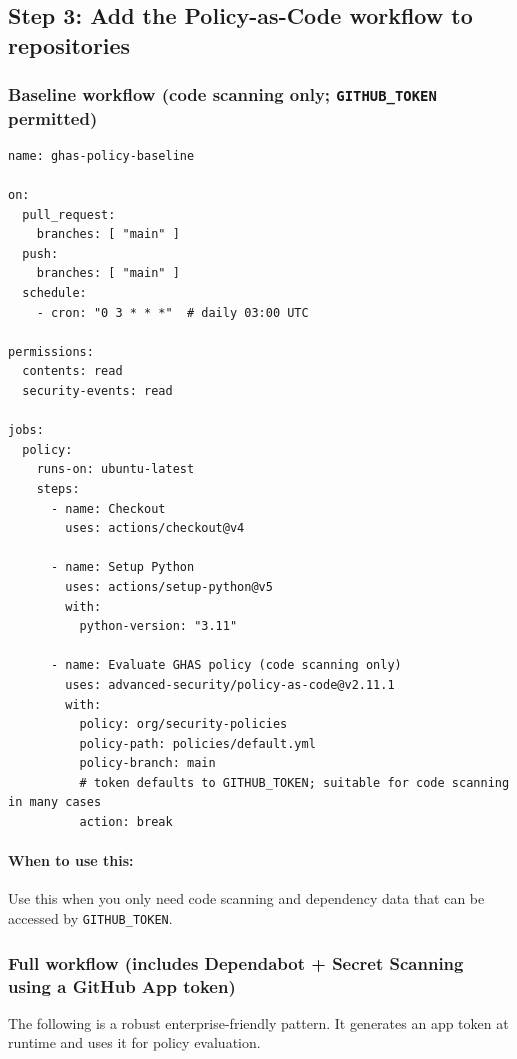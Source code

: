 \documentclass[11pt]{article}
\renewcommand{\cmd}[1]{\texttt{#1}}
\begin{document}
\subsection{Step 3: Add the Policy-as-Code workflow to repositories}

\subsubsection{Baseline workflow (code scanning only; \cmd{GITHUB\_TOKEN} permitted)}

\begin{verbatim}
name: ghas-policy-baseline

on:
  pull_request:
    branches: [ "main" ]
  push:
    branches: [ "main" ]
  schedule:
    - cron: "0 3 * * *"  # daily 03:00 UTC

permissions:
  contents: read
  security-events: read

jobs:
  policy:
    runs-on: ubuntu-latest
    steps:
      - name: Checkout
        uses: actions/checkout@v4

      - name: Setup Python
        uses: actions/setup-python@v5
        with:
          python-version: "3.11"

      - name: Evaluate GHAS policy (code scanning only)
        uses: advanced-security/policy-as-code@v2.11.1
        with:
          policy: org/security-policies
          policy-path: policies/default.yml
          policy-branch: main
          # token defaults to GITHUB_TOKEN; suitable for code scanning in many cases
          action: break
\end{verbatim}

\paragraph{When to use this:} Use this when you only need code scanning and dependency data that can be accessed by \cmd{GITHUB\_TOKEN}.

\subsubsection{Full workflow (includes Dependabot + Secret Scanning using a GitHub App token)}

The following is a robust enterprise-friendly pattern. It generates an app token at runtime and uses it for policy evaluation.
\end{document}
